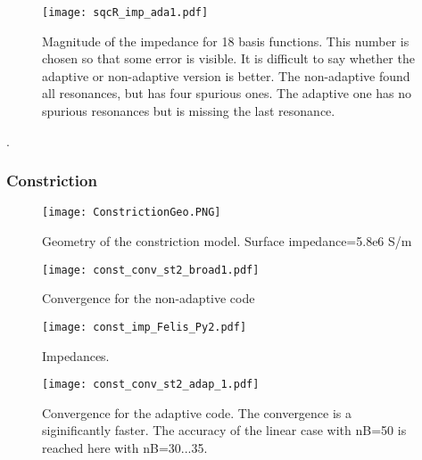\begin{figure}[h]
	\centering
	\texttt{[image: sqcR\_imp\_ada1.pdf]}
	\caption{Magnitude of the impedance for 18 basis functions. This number is chosen so that some error is visible. It is difficult to say whether the adaptive or non-adaptive version is better. The non-adaptive found all resonances, but has four spurious ones. The adaptive one has no spurious resonances but is missing the last resonance.}
	\label{}
\end{figure}

\newpage.
\subsubsection{Constriction}


\begin{figure}[h]
	\centering
	\texttt{[image: ConstrictionGeo.PNG]}
	\caption{Geometry of the constriction model. Surface impedance=5.8e6 S/m }
	\label{}
\end{figure}

\begin{figure}[h]
	\centering
	\texttt{[image: const\_conv\_st2\_broad1.pdf]}
	\caption{Convergence for the non-adaptive code }
	\label{}
\end{figure}


\begin{figure}[h]
	\centering
	\texttt{[image: const\_imp\_Felis\_Py2.pdf]}
	\caption{Impedances. }
	\label{}
\end{figure}

\begin{figure}[h]
	\centering
	\texttt{[image: const\_conv\_st2\_adap\_1.pdf]}
	\caption{Convergence for the adaptive code. The convergence is a siginificantly faster. The accuracy of the linear case with nB=50 is reached here with nB=30...35.}
	\label{}
\end{figure}

